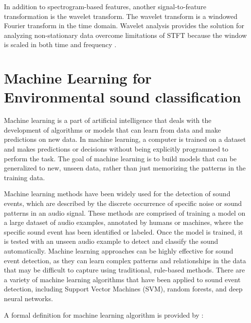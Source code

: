 In addition to spectrogram-based features, another signal-to-feature transformation is the wavelet transform. The wavelet transform is a windowed Fourier transform in the time domain. Wavelet analysis provides the solution for analyzing non-stationary data \cite{ricker1940form} overcome limitations of STFT because the window is scaled in both time and frequency \cite{wirsing2020time}. 


\section{Machine Learning for Environmental sound classification} 
\label{chapter:backroundMachineLearningESC}
Machine learning is a part of artificial intelligence that deals with the development of algorithms or models that can learn from data and make predictions on new data. In machine learning, a computer is trained on a dataset and makes predictions or decisions without being explicitly programmed to perform the task. The goal of machine learning is to build models that can be generalized to new, unseen data, rather than just memorizing the patterns in the training data.

Machine learning methods have been widely used for the detection of sound events, which are described by the discrete occurrence of specific noise or sound patterns in an audio signal. These methods are comprised of training a model on a large dataset of audio examples, annotated by humans or machines, where the specific sound event has been identified or labeled. Once the model is trained, it is tested with an unseen audio example to detect and classify the sound automatically. Machine learning approaches can be highly effective for sound event detection, as they can learn complex patterns and relationships in the data that may be difficult to capture using traditional, rule-based methods. There are a variety of machine learning algorithms that have been applied to sound event detection, including Support Vector Machines (SVM), random forests, and deep neural networks.

A formal definition for machine learning algorithm is provided by \cite{mitchell1997machine}: 



